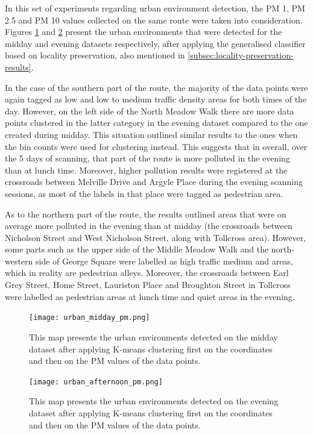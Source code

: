 \documentclass[bsc,frontabs,twoside,singlespacing, parskip,deptreport]{infthesis}     %
\begin{document}
In this set of experiments regarding urban environment detection, the PM 1, PM 2.5 and PM 10 values collected on the same route were taken into consideration. Figures \ref{fig:urban_midday_pm} and \ref{fig:urban_afternoon_pm} present the urban environments that were detected for the midday and evening datasets respectively, after applying the generalised classifier based on locality preservation, also mentioned in \ref{subsec:locality-preservation-results}.

In the case of the southern part of the route, the majority of the data points were again tagged as low and low to medium traffic density areas for both times of the day. However, on the left side of the North Meadow Walk there are more data points clustered in the latter category in the evening dataset compared to the one created during midday. This situation outlined similar results to the ones when the bin counts were used for clustering instead. This suggests that in overall, over the 5 days of scanning, that part of the route is more polluted in the evening than at lunch time. Moreover, higher pollution results were registered at the crossroads between Melville Drive and Argyle Place during the evening scanning sessions, as most of the labels in that place were tagged as pedestrian area.

As to the northern part of the route, the results outlined areas that were on average more polluted in the evening than at midday (the crossroads between Nicholson Street and West Nicholson Street, along with Tollcross area). However, some parts such as the upper side of the Middle Meadow Walk and the north-western side of George Square were labelled as high traffic medium and areas, which in reality are pedestrian alleys. Moreover, the crossroads between Earl Grey Street, Home Street, Lauriston Place and Broughton Street in Tollcross were labelled as pedestrian areas at lunch time and quiet areas in the evening.


\begin{figure}[h!]
  \center
  \texttt{[image: urban\_midday\_pm.png]}
  \caption{This map presents the urban environments detected on the midday dataset after applying K-means clustering first on the coordinates and then on the PM values of the data points.}
  \label{fig:urban_midday_pm}
\end{figure}

\begin{figure}[h!]
  \center
  \texttt{[image: urban\_afternoon\_pm.png]}
  \caption{This map presents the urban environments detected on the evening dataset after applying K-means clustering first on the coordinates and then on the PM values of the data points.}
  \label{fig:urban_afternoon_pm}
\end{figure}
\end{document}
